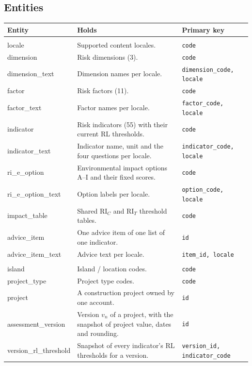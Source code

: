 \documentclass[11pt,a4paper]{article}
\newcommand{\RIC}{\mathrm{RI}_{C}}
\newcommand{\RIT}{\mathrm{RI}_{T}}
\begin{document}
\subsection{Entities}
{\small
\begin{longtable}{@{}>{\ttfamily}l R{7.2cm} R{4.2cm}@{}}
\toprule{}\normalfont Entity & Holds & Primary key \\ \midrule\endhead
{}\\
locale & Supported content locales. & \texttt{code} \\
dimension & Risk dimensions (3). & \texttt{code} \\
dimension\_text & Dimension names per locale. & \texttt{dimension\_code, locale} \\
factor & Risk factors (11). & \texttt{code} \\
factor\_text & Factor names per locale. & \texttt{factor\_code, locale} \\
indicator & Risk indicators (55) with their current RL thresholds. & \texttt{code} \\
indicator\_text & Indicator name, unit and the four questions per locale. & \texttt{indicator\_code, locale} \\
ri\_e\_option & Environmental impact options A--I and their fixed scores. & \texttt{code} \\
ri\_e\_option\_text & Option labels per locale. & \texttt{option\_code, locale} \\
impact\_table & Shared $\RIC$ and $\RIT$ threshold tables. & \texttt{code} \\
advice\_item & One advice item of one list of one indicator. & \texttt{id} \\
advice\_item\_text & Advice text per locale. & \texttt{item\_id, locale} \\
\\
island & Island / location codes. & \texttt{code} \\
project\_type & Project type codes. & \texttt{code} \\
project & A construction project owned by one account. & \texttt{id} \\
assessment\_version & Version $v_n$ of a project, with the snapshot of project value, dates and rounding. & \texttt{id} \\
version\_rl\_threshold & Snapshot of every indicator's RL thresholds for a version. & \texttt{version\_id, indicator\_code} \\

\end{longtable}}
\end{document}
